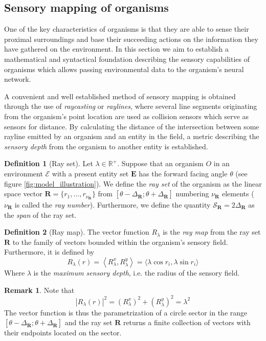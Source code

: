\documentclass[a4paper, 12pt]{report}
\theoremstyle{definition}
\newtheorem{definition}{Definition}
\newtheorem*{remark}{Remark}
\begin{document}
\subsection{Sensory mapping of organisms}
One of the key characteristics of organisms is that they are able to sense their proximal surroundings and base their succeeding actions on the information they
have gathered on the environment. In this section we aim to establish a mathematical and syntactical foundation describing the sensory capabilities of organisms
which allows passing environmental data to the organism's neural network.
\par A convenient and well established method of sensory mapping is obtained through the use of \emph{raycasting} or \emph{raylines}, where several line segments
originating from the organism's point location are used as collision sensors which serve as sensors for distance. By calculating the distance of the intersection between
some rayline emitted by an organism and an entity in the field, a metric describing the \emph{sensory depth} from the organism to another entity is established. 

\begin{definition}[Ray set]
    Let $\lambda \in \mathbb R^+$. Suppose that an organism $O$ in an environment $\mathscr E$ with a present entity set $\mathbf E$ has the forward
    facing angle $\theta$ (see figure \ref{fig:model_illustration}). We define the \emph{ray set} of the organism as the linear space vector $\mathbf R = \{r_1, \ldots, r_{\nu_{\mathbf R}}\}$ from $\left[\theta - \Delta_{\mathbf R}; \theta + \Delta_{\mathbf R}\right]$
    numbering $\nu_{\mathbf R}$ elements ($\nu_{\mathbf R}$ is called the \emph{ray number}). Furthermore, we define the quantity $\mathcal S_{\mathbf R} = 2 \Delta_{\mathbf R}$ as the \emph{span} of the ray set.
\end{definition}

\begin{definition}[Ray map]
   The vector function $R_{\lambda}$ is the \emph{ray map} from the ray set $\mathbf R$ to the family of vectors bounded within the organism's sensory field.
   Furthermore, it is defined by
   \[
        R_{\lambda}(r) = \left\langle R_\lambda^x, R_\lambda^y \right\rangle = \langle \lambda \cos r_i, \lambda \sin r_i \rangle
   \]
    Where $\lambda$ is the \emph{maximum sensory depth}, i.e. the radius of the sensory field.
\end{definition}

\begin{remark}
    Note that
    \[
        |R_\lambda(r)|^2 = \left(R_\lambda^x\right)^2 + \left(R_\lambda^y\right)^2 = \lambda^2
    \]
    The vector function is thus the parametrization of a circle sector in the range $\left[\theta - \Delta_{\mathbf R}; \theta + \Delta_{\mathbf R}\right]$
    and the ray set $\mathbf R$ returns a finite collection of vectors with their endpoints located on the sector.
\end{remark}
\end{document}
